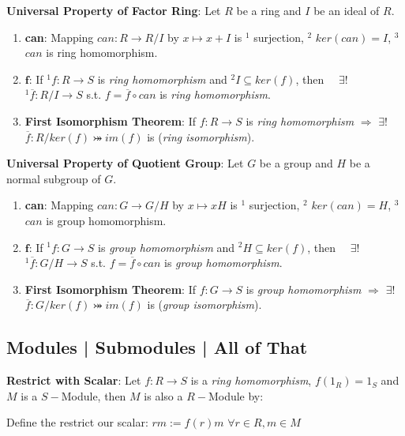\documentclass[9pt]{article}
\begin{document}
\textbf{Universal Property of Factor Ring}: Let $R$ be a ring and $I$ be an ideal of $R$. 

\begin{enumerate}[itemsep=-2pt, topsep=-2pt]
    \item \textbf{can}: Mapping $can:R\to R/I$ by $x\mapsto x+I$ is $^1$ surjection, $^2$ $ker(can)=I$, $^3$ $can$ is ring homomorphism.
    \item \textbf{$\textbf{f}$}: If $^1f:R\to S$ is \textit{ring homomorphism} and $^2I\subseteq ker(f)$, then \ \ $\exists!$ $^1\overline{f}:R/I\to S$ s.t. $f=\overline{f}\circ can$ is \textit{ring homomorphism}.
    \item \textbf{First Isomorphism Theorem}: If $f:R\to S$ is \textit{ring homomorphism} $\Rightarrow$ $\exists!$ $\overline{f}:R/ker(f)\bij im(f)$ is  (\textit{ring isomorphism}).
\end{enumerate}

\textbf{Universal Property of Quotient Group}: Let $G$ be a group and $H$ be a normal subgroup of $G$. 
\begin{enumerate}[itemsep=-2pt, topsep=-2pt]
    \item \textbf{can}: Mapping $can:G\to G/H$ by $x\mapsto xH$ is $^1$ surjection, $^2$ $ker(can)=H$, $^3$ $can$ is group homomorphism.
    \item \textbf{$\textbf{f}$}: If $^1f:G\to S$ is \textit{group homomorphism} and $^2H\subseteq ker(f)$, then \ \ $\exists!$ $^1\overline{f}:G/H\to S$ s.t. $f=\overline{f}\circ can$ is \textit{group homomorphism}.
    \item \textbf{First Isomorphism Theorem}: If $f:G\to S$ is \textit{group homomorphism} $\Rightarrow$ $\exists!$ $\overline{f}:G/ker(f)\bij im(f)$ is  (\textit{group isomorphism}).
\end{enumerate}


\subsection{Modules | Submodules | All of That} %

\textbf{Restrict with Scalar}: Let $f:R\to S$ is a \textit{ring homomorphism}, $f(1_R)=1_S$ and $M$ is a $S-$Module, then $M$ is also a $R-$Module by:

\quad Define the restrict our scalar: $rm:=f(r)m$ \quad $\forall r\in R,m\in M$ 
\end{document}
